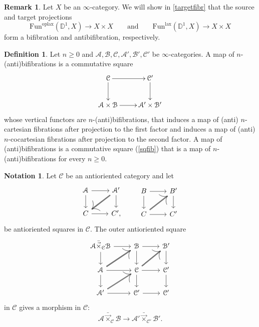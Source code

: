 \documentclass[10pt,oneside]{article}
\numberwithin{equation}{section} %
\numberwithin{figure}{section} %
\theoremstyle{plain}
\theoremstyle{definition}
\newtheorem{definition}[theorem]{Definition}
\newtheorem{notation}[theorem]{Notation}
\newtheorem{remark}[theorem]{Remark}
\newcommand{\bD}{{\mathbb D}}
\newcommand{\mA}{{\mathcal A}}
\newcommand{\mB}{{\mathcal B}}
\newcommand{\mC}{{\mathcal C}}
\newcommand{\Fun}{\mathrm{Fun}}
\newcommand{\lax}{{\mathrm{lax}}}
\newcommand{\oplax}{{\mathrm{oplax}}}
\begin{document}
\begin{remark}
Let $X$ be an $\infty$-category.
We will show in \cref{targetfibr} that the source and target projections
\[
\Fun^{\oplax}(\bD^1,X)\to X\times X\qquad\text{and}\qquad \Fun^{\lax}(\bD^1,X)\to X\times X
\]
form a bifibration and antibifibration, respectively.
\end{remark}

\begin{definition}
Let $ n \geq 0 $ and $\mA,\mB,\mC, \mA',\mB',\mC'$ be $\infty$-categories.
A map of $n$-(anti)bifibrations is a commutative square
\begin{equation}\label{sqfib}
\xymatrix{
\mC \ar[r] \ar[d] & \mC' \ar[d] \\
\mA \times \mB \ar[r] & \mA' \times \mB'
}
\end{equation}
whose vertical functors are $n$-(anti)bifibrations,
that induces a map of (anti) $n$-cartesian fibrations after projection to the first factor and induces a map of (anti) $n$-cocartesian fibrations after projection to the second factor.
A map of (anti)bifibrations is a commutative square
(\ref{sqfib}) that is a map of $n$-(anti)bifibrations for every $n \geq 0.$


\end{definition}

\begin{notation}

Let $\mC$ be an antioriented category  and let
$$
\begin{tikzcd}
\mA \ar{r}{} \ar{d}[swap]{} & \mA' \ar[double]{dl}{} \ar{d}{} \\
C  \ar{r}[swap]{} & C',
\end{tikzcd}
\qquad
\begin{tikzcd}
B \ar{r}{} \ar{d}[swap]{} & B'  \ar{d}{} \\
C \ar[double]{ur}{}  \ar{r}[swap]{} & C'
\end{tikzcd}
$$
be antioriented squares in $\mC$. 
The outer antioriented square 
$$
\begin{tikzcd}
\mA {\bar{\vec{\times}}}_{\mC} \mB \ar{r}{} \ar{d}[swap]{} & \mB \ar{d}{}\ar{r}{} & \mB' \ar{d}{} \\
\mA \ar[double]{ur}{} \ar{d}{} \ar{r}[swap]{} & \mC \ar[double]{ur}{} \ar{d}{}\ar{r}{} & \mC' \ar{d}{} \\
\mA' \ar[double]{ur}{} \ar{r}{} & \mC' \ar{r}{} & \mC'
\end{tikzcd}
$$
in $\mC$ gives a morphism in $\mC:$
$$  \mA {\bar{\vec{\times}}}_{\mC} \mB \to \mA' {\bar{\vec{\times}}}_{\mC'} \mB'.$$

\end{notation}
\end{document}
